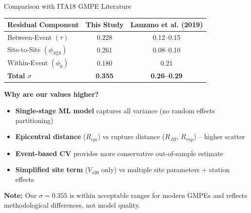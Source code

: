 \documentclass[aspectratio=169,11pt]{beamer}
\begin{document}
\begin{frame}{Comparison with ITA18 GMPE Literature}
\begin{table}
\centering
\small
\begin{tabular}{@{}lcc@{}}
\toprule
\textbf{Residual Component} & \textbf{This Study} & \textbf{Lanzano et al. (2019)} \\
\midrule
Between-Event $(\tau)$ & 0.228 & 0.12--0.15 \\
Site-to-Site $(\phi_{S2S})$ & 0.261 & 0.08--0.10 \\
Within-Event $(\phi_0)$ & 0.180 & 0.21 \\
\midrule
\textbf{Total $\sigma$} & \textbf{0.355} & \textbf{0.26--0.29} \\
\bottomrule
\end{tabular}
\end{table}

\vspace{0.2cm}
\textbf{Why are our values higher?}
\begin{itemize}
    \item \textbf{Single-stage ML model} captures all variance (no random effects partitioning)
    \item \textbf{Epicentral distance} ($R_{epi}$) vs rupture distance ($R_{JB}$, $R_{rup}$) -- higher scatter
    \item \textbf{Event-based CV} provides more conservative out-of-sample estimate
    \item \textbf{Simplified site term} ($V_{s30}$ only) vs multiple site parameters + station effects
\end{itemize}

\vspace{0.1cm}
\footnotesize{\textbf{Note:} Our $\sigma = 0.355$ is within acceptable ranges for modern GMPEs and reflects methodological differences, not model quality.}
\end{frame}
\end{document}
